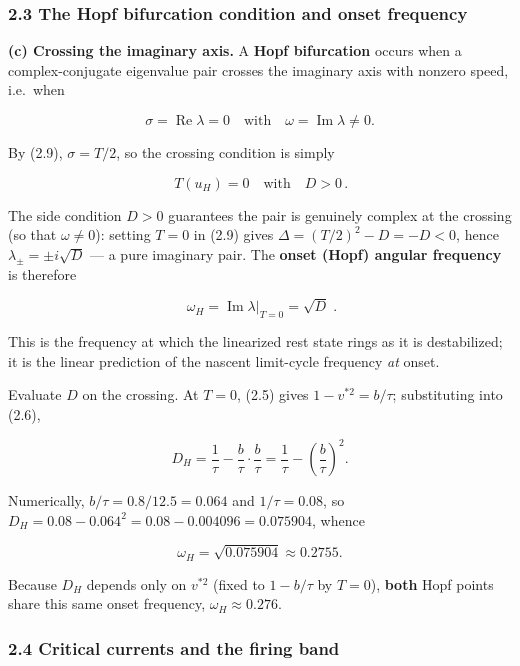 \documentclass[
  11pt,
]{article}
\providecommand{\lt}{<}
\providecommand{\gt}{>}
\begin{document}
\subsubsection{2.3 The Hopf bifurcation condition and onset
frequency}\label{the-hopf-bifurcation-condition-and-onset-frequency}

\textbf{(c) Crossing the imaginary axis.} A \textbf{Hopf bifurcation}
occurs when a complex-conjugate eigenvalue pair crosses the imaginary
axis with nonzero speed, i.e.~when

\[
\sigma = \operatorname{Re}\lambda = 0 \quad\text{with}\quad \omega = \operatorname{Im}\lambda \neq 0.
\tag{2.11}
\]

By (2.9), \(\sigma = T/2\), so the crossing condition is simply

\[
\boxed{\,T(u_H) = 0 \quad\text{with}\quad D \gt  0\,}.
\tag{2.12}
\]

The side condition \(D\gt 0\) guarantees the pair is genuinely complex
at the crossing (so that \(\omega\neq0\)): setting \(T=0\) in (2.9)
gives \(\Delta = (T/2)^2 - D = -D \lt  0\), hence
\(\lambda_{\pm} = \pm i\sqrt{D}\) --- a pure imaginary pair. The
\textbf{onset (Hopf) angular frequency} is therefore

\[
\boxed{\;\omega_H = \operatorname{Im}\lambda\big|_{T=0} = \sqrt{D}\;}.
\tag{2.13}
\]

This is the frequency at which the linearized rest state rings as it is
destabilized; it is the linear prediction of the nascent limit-cycle
frequency \emph{at} onset.

Evaluate \(D\) on the crossing. At \(T=0\), (2.5) gives
\(1 - v^{*2} = b/\tau\); substituting into (2.6),

\[
D_H = \frac{1}{\tau} - \frac{b}{\tau}\cdot\frac{b}{\tau}
= \frac{1}{\tau} - \left(\frac{b}{\tau}\right)^{2}.
\tag{2.14}
\]

Numerically, \(b/\tau = 0.8/12.5 = 0.064\) and \(1/\tau = 0.08\), so
\(D_H = 0.08 - 0.064^2 = 0.08 - 0.004096 = 0.075904\), whence

\[
\omega_H = \sqrt{0.075904} \approx 0.2755 .
\tag{2.15}
\]

Because \(D_H\) depends only on \(v^{*2}\) (fixed to \(1 - b/\tau\) by
\(T=0\)), \textbf{both} Hopf points share this same onset frequency,
\(\omega_H \approx 0.276\).

\subsubsection{2.4 Critical currents and the firing
band}\label{critical-currents-and-the-firing-band}
\end{document}
